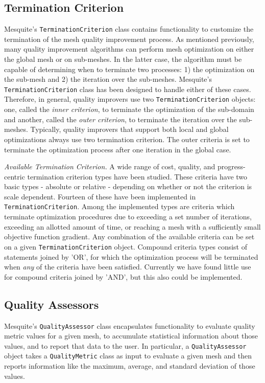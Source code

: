 \documentclass[psfig]{article}
\begin{document}
\subsection{Termination Criterion}
\label{termination_section}

Mesquite's \texttt{TerminationCriterion} class contains functionality
to customize the termination of the mesh quality improvement process.
As mentioned previously, many quality improvement algorithms can
perform mesh optimization on either the global mesh or on sub-meshes.
In the latter case, the algorithm must be capable of determining when
to terminate two processes: 1) the optimization on the sub-mesh and 2)
the iteration over the sub-meshes.  Mesquite's
\texttt{TerminationCriterion} class has been designed to handle either
of these cases.  Therefore, in general, quality improvers use two
\texttt{TerminationCriterion} objects: one, called the {\it inner
criterion}, to terminate the optimization of the sub-domain and
another, called the {\it outer criterion}, to terminate the iteration
over the sub-meshes.  Typically, quality improvers that support both
local and global optimizations always use two termination criterion. 
The outer criteria is set to terminate the optimization process after
one iteration in the global case.

{\it Available Termination Criterion.}  A wide range of cost, quality, 
and progress-centric termination
criterion types have been studied. These criteria have two basic types - 
absolute or relative - depending on whether or not the criterion is scale 
dependent.  Fourteen of these have been
implemented in \texttt{TerminationCriterion}.  Among the implemented
types are criteria which terminate optimization procedures due to
exceeding a set number of iterations, exceeding an allotted amount of
time, or reaching a mesh with a sufficiently small objective function
gradient.  Any combination of the available criteria can be set on a given
\texttt{TerminationCriterion} object.  Compound criteria types consist
of statements joined by 'OR', for which 
the optimization process will be terminated when {\it any} of
the criteria have been satisfied.  Currently we have found little use
for compound criteria joined by 'AND', but this also could be implemented. 

\subsection{Quality Assessors}

Mesquite's \texttt{QualityAssessor} class encapsulates functionality to
evaluate quality metric values for a given mesh, to accumulate
statistical information about those values, and to report that data to
the user.  In particular, a \texttt{QualityAssessor} object takes a
{\tt QualityMetric} class as input to evaluate a given mesh and then
reports information like the maximum, average, and standard deviation
of those values.
\end{document}
